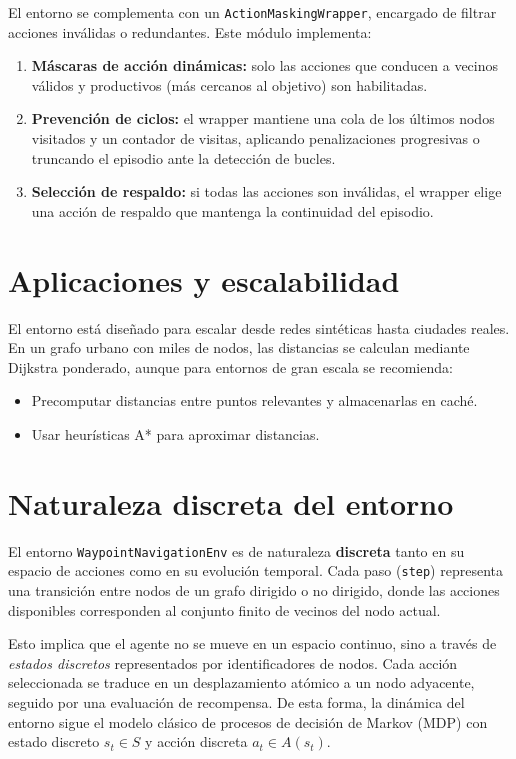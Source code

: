 \documentclass[11pt,a4paper]{article}
\begin{document}
El entorno se complementa con un \texttt{ActionMaskingWrapper}, encargado de filtrar acciones inválidas o redundantes. Este módulo implementa:
\begin{enumerate}
    \item \textbf{Máscaras de acción dinámicas:} solo las acciones que conducen a vecinos válidos y productivos (más cercanos al objetivo) son habilitadas.
    \item \textbf{Prevención de ciclos:} el wrapper mantiene una cola de los últimos nodos visitados y un contador de visitas, aplicando penalizaciones progresivas o truncando el episodio ante la detección de bucles.
    \item \textbf{Selección de respaldo:} si todas las acciones son inválidas, el wrapper elige una acción de respaldo que mantenga la continuidad del episodio.
\end{enumerate}

\section{Aplicaciones y escalabilidad}

El entorno está diseñado para escalar desde redes sintéticas hasta ciudades reales. En un grafo urbano con miles de nodos, las distancias se calculan mediante Dijkstra ponderado, aunque para entornos de gran escala se recomienda:
\begin{itemize}
    \item Precomputar distancias entre puntos relevantes y almacenarlas en caché.
    \item Usar heurísticas A* para aproximar distancias.
\end{itemize}

\section{Naturaleza discreta del entorno}

El entorno \texttt{WaypointNavigationEnv} es de naturaleza \textbf{discreta} tanto en su espacio de acciones como en su evolución temporal. Cada paso (\texttt{step}) representa una transición entre nodos de un grafo dirigido o no dirigido, donde las acciones disponibles corresponden al conjunto finito de vecinos del nodo actual. 

Esto implica que el agente no se mueve en un espacio continuo, sino a través de \textit{estados discretos} representados por identificadores de nodos. Cada acción seleccionada se traduce en un desplazamiento atómico a un nodo adyacente, seguido por una evaluación de recompensa. De esta forma, la dinámica del entorno sigue el modelo clásico de procesos de decisión de Markov (MDP) con estado discreto \( s_t \in S \) y acción discreta \( a_t \in A(s_t) \).
\end{document}
